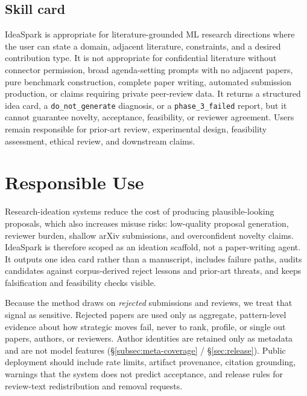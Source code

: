 \documentclass[10pt,a4paper]{article}
\begin{document}
\subsection{Skill card}
\label{subsec:skill-card}

IdeaSpark is appropriate for literature-grounded ML research directions where the user can state a domain, adjacent literature, constraints, and a desired contribution type. It is not appropriate for confidential literature without connector permission, broad agenda-setting prompts with no adjacent papers, pure benchmark construction, complete paper writing, automated submission production, or claims requiring private peer-review data. It returns a structured idea card, a \texttt{do\_not\_generate} diagnosis, or a \texttt{phase\_3\_failed} report, but it cannot guarantee novelty, acceptance, feasibility, or reviewer agreement. Users remain responsible for prior-art review, experimental design, feasibility assessment, ethical review, and downstream claims.

\section{Responsible Use}
\label{sec:responsible-use}

Research-ideation systems reduce the cost of producing plausible-looking proposals, which also increases misuse risks: low-quality proposal generation, reviewer burden, shallow arXiv submissions, and overconfident novelty claims. IdeaSpark is therefore scoped as an ideation scaffold, not a paper-writing agent. It outputs one idea card rather than a manuscript, includes failure paths, audits candidates against corpus-derived reject lessons and prior-art threats, and keeps falsification and feasibility checks visible.

Because the method draws on \emph{rejected} submissions and reviews, we treat that signal as sensitive. Rejected papers are used only as aggregate, pattern-level evidence about how strategic moves fail, never to rank, profile, or single out papers, authors, or reviewers. Author identities are retained only as metadata and are not model features (\S\ref{subsec:meta-coverage} / \S\ref{sec:release}). Public deployment should include rate limits, artifact provenance, citation grounding, warnings that the system does not predict acceptance, and release rules for review-text redistribution and removal requests.
\end{document}
